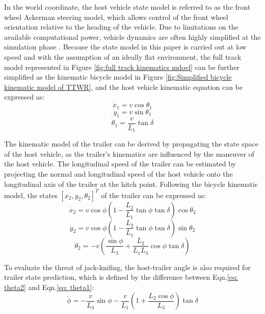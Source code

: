 In the world coordinate, the host vehicle state model is referred to as the front wheel Ackerman steering model, which allows control of the front wheel orientation relative to the heading of the vehicle. Due to limitations on the available computational power, vehicle dynamics are often highly simplified at the simulation phase \parencite{polack2017kinematic}. Because the state model in this paper is carried out at low speed and with the assumption of an ideally flat environment, the full track model represented in Figure \ref{fig:full track kinematics mdoel} can be further simplified as the kinematic bicycle model in Figure \ref{fig:Simplified bicycle kinematic model of TTWR}, and the host vehicle kinematic equation can be expressed as:
\begin{equation} \dot{x}_1=v \cos{\theta_1} \label{eq: x1}\end{equation}
\begin{equation} \dot{y}_1=v \sin{\theta_1} \label{eq: y1}\end{equation}
\begin{equation} \dot{\theta}_1 = \frac{v}{L_1}\tan{\delta} \label{eq: theta1}\end{equation}

The kinematic model of the trailer can be derived by propagating the state space of the host vehicle, as the trailer's kinematics are influenced by the maneuver of the host vehicle. The longitudinal speed of the trailer can be estimated by projecting the normal and longitudinal speed of the host vehicle onto the longitudinal axis of the trailer at the hitch point. Following the bicycle kinematic model, the states $[x_2, y_2, \theta_2]^T$ of the trailer can be expressed as:
\begin{equation} \dot{x}_2 = v \cos{\phi} (1 - \frac{L_2}{L_1}\tan{\phi}\tan{\delta})\cos{\theta_2} \label{eq: x2}\end{equation}
\begin{equation} \dot{y}_2 = v \cos{\phi} (1 - \frac{L_2}{L_1}\tan{\phi}\tan{\delta})\sin{\theta_2} \label{eq: y2}\end{equation}
\begin{equation} \dot{\theta}_2 = -v (\frac{\sin{\phi}}{L_3} + \frac{L_2}{L_1 L_3}\cos{\phi}\tan{\delta} ) \label{eq: theta2}\end{equation}

To evaluate the threat of jack-knifing, the host-trailer angle is also required for trailer state prediction, which is defined by the difference between Eqn.\ref{eq: theta2} and Eqn.\ref{eq: theta1}:
\begin{equation} 
\dot{\phi} = -\frac{v}{L_3}\sin{\phi} - \frac{v}{L_1} ( 1 + \frac{L_2 \cos{\phi}}{L_3}) \tan{\delta} 
\label{eq: phi}
\end{equation}

